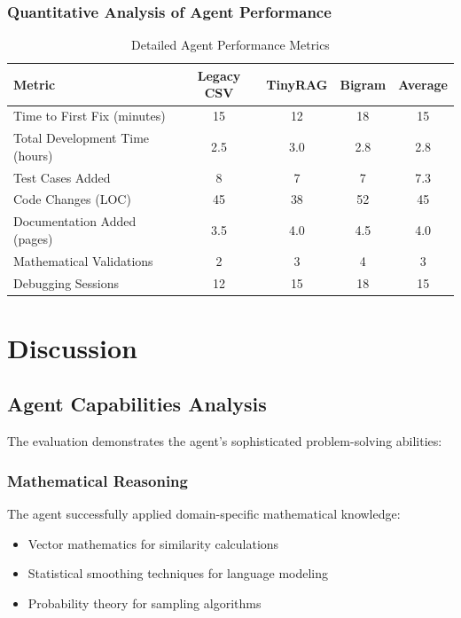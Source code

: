 \documentclass[12pt, a4paper]{article}
\begin{document}
\subsubsection{Quantitative Analysis of Agent Performance}

\begin{table}[H]
    \centering
    \caption{Detailed Agent Performance Metrics}
    \begin{tabular}{@{}lcccc@{}}
        \toprule
        \textbf{Metric} & \textbf{Legacy CSV} & \textbf{TinyRAG} & \textbf{Bigram} & \textbf{Average} \\
        \midrule
        Time to First Fix (minutes) & 15 & 12 & 18 & 15 \\
        Total Development Time (hours) & 2.5 & 3.0 & 2.8 & 2.8 \\
        Test Cases Added & 8 & 7 & 7 & 7.3 \\
        Code Changes (LOC) & 45 & 38 & 52 & 45 \\
        Documentation Added (pages) & 3.5 & 4.0 & 4.5 & 4.0 \\
        Mathematical Validations & 2 & 3 & 4 & 3 \\
        Debugging Sessions & 12 & 15 & 18 & 15 \\
        \bottomrule
    \end{tabular}
    \label{tab:detailed_performance}
\end{table}

\section{Discussion}

\subsection{Agent Capabilities Analysis}

The evaluation demonstrates the agent's sophisticated problem-solving abilities:

\subsubsection{Mathematical Reasoning}
The agent successfully applied domain-specific mathematical knowledge:
\begin{itemize}
    \item Vector mathematics for similarity calculations
    \item Statistical smoothing techniques for language modeling
    \item Probability theory for sampling algorithms
\end{itemize}
\end{document}
